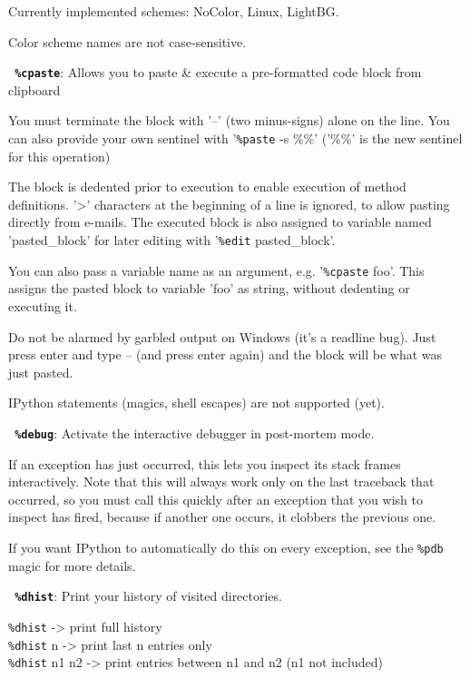         Currently implemented schemes: NoColor, Linux, LightBG.

        Color scheme names are not case-sensitive.

\bigskip
\texttt{\textbf{ \%cpaste}}:
	Allows you to paste \& execute a pre-formatted code block from clipboard
        
        You must terminate the block with '--' (two minus-signs) alone on the
        line. You can also provide your own sentinel with '\texttt{\%paste} -s \%\%' ('\%\%' 
        is the new sentinel for this operation)
        
        The block is dedented prior to execution to enable execution of 
        method definitions. '>' characters at the beginning of a line is
        ignored, to allow pasting directly from e-mails. The executed block
        is also assigned to variable named 'pasted\_block' for later editing
        with '\texttt{\%edit} pasted\_block'.
        
        You can also pass a variable name as an argument, e.g. '\texttt{\%cpaste} foo'.
        This assigns the pasted block to variable 'foo' as string, without 
        dedenting or executing it.
        
        Do not be alarmed by garbled output on Windows (it's a readline bug). 
        Just press enter and type -- (and press enter again) and the block 
        will be what was just pasted.
        
        IPython statements (magics, shell escapes) are not supported (yet).
        

\bigskip
\texttt{\textbf{ \%debug}}:
	Activate the interactive debugger in post-mortem mode.

        If an exception has just occurred, this lets you inspect its stack
        frames interactively.  Note that this will always work only on the last
        traceback that occurred, so you must call this quickly after an
        exception that you wish to inspect has fired, because if another one
        occurs, it clobbers the previous one.

        If you want IPython to automatically do this on every exception, see
        the \texttt{\%pdb} magic for more details.
        

\bigskip
\texttt{\textbf{ \%dhist}}:
	Print your history of visited directories.

        \texttt{\%dhist}       -> print full history\\
        \texttt{\%dhist} n     -> print last n entries only\\
        \texttt{\%dhist} n1 n2 -> print entries between n1 and n2 (n1 not included)\\

